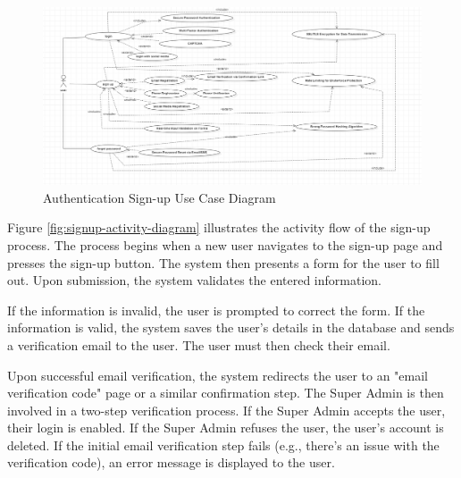 \begin{figure}[ht!]
    \centering
    \includegraphics[width=1.03\textwidth]{images/diagram_de_case_d_utilisation_signup.png}
    \caption{Authentication Sign-up Use Case Diagram}
    \label{fig:signup-diagram}
\end{figure}

Figure \ref{fig:signup-activity-diagram} illustrates the activity flow of the sign-up process. The process begins when a new user navigates to the sign-up page and presses the sign-up button. The system then presents a form for the user to fill out. Upon submission, the system validates the entered information. 

If the information is invalid, the user is prompted to correct the form. If the information is valid, the system saves the user's details in the database and sends a verification email to the user. The user must then check their email. 

Upon successful email verification, the system redirects the user to an "email verification code" page or a similar confirmation step. The Super Admin is then involved in a two-step verification process. If the Super Admin accepts the user, their login is enabled. If the Super Admin refuses the user, the user's account is deleted. If the initial email verification step fails (e.g., there's an issue with the verification code), an error message is displayed to the user.

\newpage

